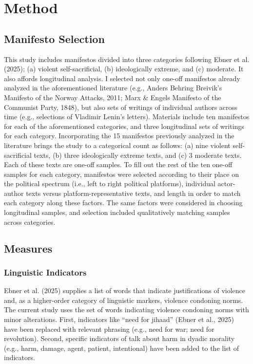\documentclass[
  english,
  man,floatsintext]{apa6}
\begin{document}
\section{Method}\label{method}

\subsection{Manifesto Selection}\label{manifesto-selection}

This study includes manifestos divided into three categories following Ebner et al. (2025); (a) violent self-sacrificial, (b) ideologically extreme, and (c) moderate. It also affords longitudinal analysis. I selected not only one-off manifestos already analyzed in the aforementioned literature (e.g., Anders Behring Breivik's Manifesto of the Norway Attacks, 2011; Marx \& Engels Manifesto of the Communist Party, 1848), but also sets of writings of individual authors across time (e.g., selections of Vladimir Lenin's letters). Materials include ten manifestos for each of the aforementioned categories, and three longitudinal sets of writings for each category. Incorporating the 15 manifestos previously analyzed in the literature brings the study to a categorical count as follows: (a) nine violent self-sacrificial texts, (b) three ideologically extreme texts, and (c) 3 moderate texts. Each of these texts are one-off samples. To fill out the rest of the ten one-off samples for each category, manifestos were selected according to their place on the political spectrum (i.e., left to right political platforms), individual actor-author texts versus platform-representative texts, and length in order to match each category along these factors. The same factors were considered in choosing longitudinal samples, and selection included qualitatively matching samples across categories.

\subsection{Measures}\label{measures}

\subsubsection{Linguistic Indicators}\label{linguistic-indicators}

Ebner et al. (2025) supplies a list of words that indicate
justifications of violence and, as a higher-order category of linguistic markers, violence
condoning norms. The current study uses the set of words indicating violence condoning
norms with minor alterations. First, indicators like ``need for jihaad'' (Ebner et al., 2025)
have been replaced with relevant phrasing (e.g., need for war; need for revolution). Second,
specific indicators of talk about harm in dyadic morality (e.g., harm, damage, agent,
patient, intentional) have been added to the list of indicators.\\
\end{document}
